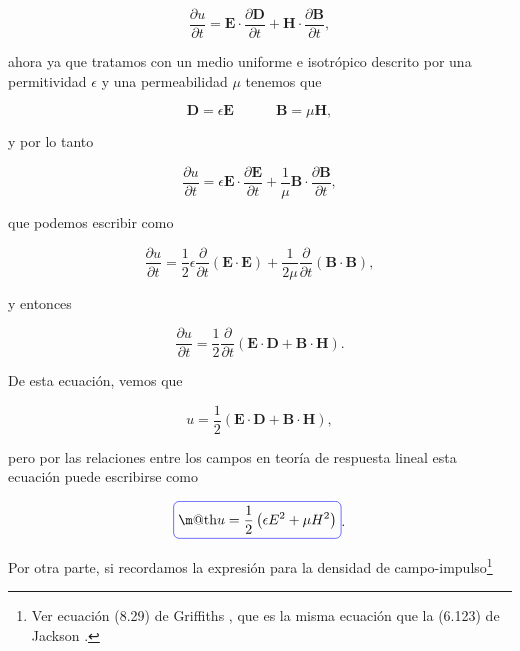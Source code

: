 \documentclass[a4paper,11pt]{article}
\makeatletter
\numberwithin{equation}{section}
\newcommand*{\boxcolor}{blue}
\renewcommand{\boxed}[1]{\textcolor{\boxcolor}{%
\tikz[baseline={([yshift=-1ex]current bounding box.center)}] \node [rectangle, minimum width=1ex,rounded corners,draw] {\normalcolor\m@th$\displaystyle#1$};}}
\makeatother
\begin{document}
\begin{equation}
 \frac{\partial u}{\partial t} = \mathbf{E} \cdot \frac{\partial \mathbf{D}}{\partial 
 t} + \mathbf{H}\cdot\frac{\partial \mathbf{B}}{\partial t},
\end{equation}

ahora ya que tratamos con un medio uniforme e isotrópico descrito por una permitividad 
$\epsilon$ y una permeabilidad $\mu$ tenemos que 

\begin{equation}
 \mathbf{D} = \epsilon\mathbf{E} \qquad \quad \mathbf{B} = \mu\mathbf{H}, 
\end{equation}

y por lo tanto

\begin{equation}
 \frac{\partial u}{\partial t} = \epsilon\mathbf{E} \cdot \frac{\partial \mathbf{E}}{\partial 
 t} + \frac{1}{\mu}\mathbf{B}\cdot\frac{\partial \mathbf{B}}{\partial t},
\end{equation}

que podemos escribir como 

\begin{equation}
  \frac{\partial u}{\partial t} = \frac{1}{2}\epsilon \frac{\partial}{\partial t}
  (\mathbf{E}\cdot \mathbf{E}) + \frac{1}{2\mu} \frac{\partial}{\partial t}
  (\mathbf{B}\cdot \mathbf{B}),
\end{equation}

y entonces 

\begin{equation}
  \frac{\partial u}{\partial t} = \frac{1}{2}\frac{\partial}{\partial t}
  (\mathbf{E}\cdot\mathbf{D} + \mathbf{B}\cdot\mathbf{H}).
\end{equation}

De esta ecuación, vemos que 

\begin{equation}
 u =  \frac{1}{2}
  (\mathbf{E}\cdot\mathbf{D} + \mathbf{B}\cdot\mathbf{H}),
\end{equation}

pero por las relaciones entre los campos en teoría de respuesta lineal esta 
ecuación puede escribirse como 

\begin{equation}
 \boxed{u = \frac{1}{2}\left(\epsilon E^2 + \mu H^2\right)}.
\end{equation}

Por otra parte, si recordamos la expresión para la densidad de campo-impulso\footnote{
Ver ecuación (8.29) de Griffiths \cite{griffiths}, que es la misma ecuación que la 
(6.123) de Jackson \cite{jackson}.}
\end{document}
